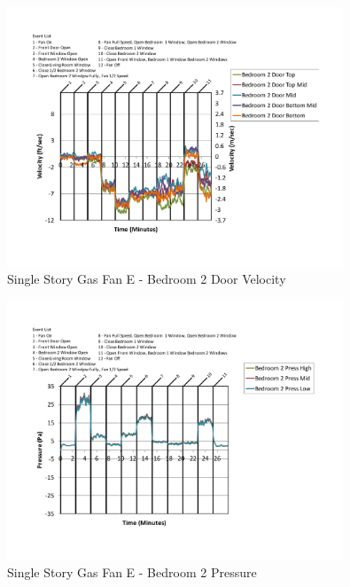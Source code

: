 \documentclass{article}
\begin{document}
\begin{appendices}
	\begin{figure}[H]
		\centering
		\includegraphics[height=3.05in,trim=0.67in 1.1in 0.67in 0.8in,clip=true]{0_Images/Results_Charts/ColdFlow/Single_Story/Gas/E/Bedroom_2_Door_Velocity.pdf}
		\caption{Single Story Gas Fan E - Bedroom 2 Door Velocity}
	\end{figure}
 

	\begin{figure}[H]
		\centering
		\includegraphics[height=3.05in,trim=0.67in 1.1in 0.67in 0.8in,clip=true]{0_Images/Results_Charts/ColdFlow/Single_Story/Gas/E/Bedroom_2_Pressure.pdf}
		\caption{Single Story Gas Fan E - Bedroom 2 Pressure}
	\end{figure}
 
	\clearpage


\end{appendices}
\end{document}
